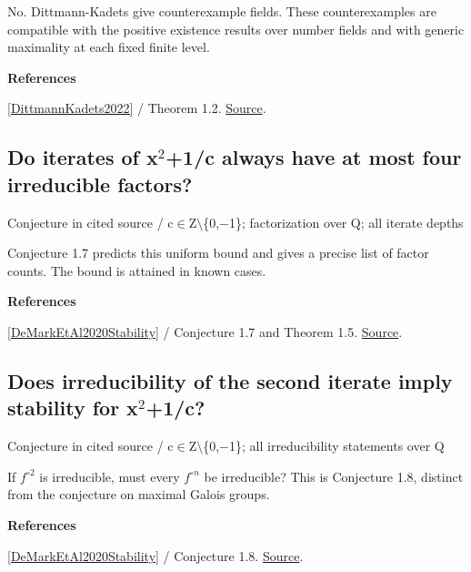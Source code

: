 \documentclass[11pt,a4paper,oneside,openany]{book}
\newenvironment{sources}{\par\smallskip\begingroup\footnotesize\color{atlasgray}\leftskip=10pt\setlength{\parskip}{2pt}}{\par\endgroup\smallskip}
\begin{document}
\color{black} No. Dittmann-Kadets give counterexample fields. These counterexamples are compatible with the positive existence results over number fields and with generic maximality at each fixed finite level.\par
\begin{sources}
\textbf{References}\par\smallskip
\noindent\hyperlink{ref:DittmannKadets2022}{[DittmannKadets2022]} / Theorem 1.2.  \href{https://arxiv.org/abs/2012.03076}{Source}.\par
\end{sources}\color{black}
\subsection*{Do iterates of x\ensuremath{{}^2}+1/c always have at most four irreducible factors?}
{\small\sffamily\color{atlasgold}Conjecture in cited source / c\ensuremath{\in}Z\ensuremath{\setminus}\{0,\ensuremath{-}1\}; factorization over Q; all iterate depths}\par\smallskip
\color{black} Conjecture 1.7 predicts this uniform bound and gives a precise list of factor counts. The bound is attained in known cases.\par
\begin{sources}
\textbf{References}\par\smallskip
\noindent\hyperlink{ref:DeMarkEtAl2020Stability}{[DeMarkEtAl2020Stability]} / Conjecture 1.7 and Theorem 1.5.  \href{https://nyjm.albany.edu/j/2020/26-25.html}{Source}.\par
\end{sources}\color{black}
\subsection*{Does irreducibility of the second iterate imply stability for x\ensuremath{{}^2}+1/c?}
{\small\sffamily\color{atlasgold}Conjecture in cited source / c\ensuremath{\in}Z\ensuremath{\setminus}\{0,\ensuremath{-}1\}; all irreducibility statements over Q}\par\smallskip
\color{black} If \(f^{\circ2}\) is irreducible, must every \(f^{\circ n}\) be irreducible? This is Conjecture 1.8, distinct from the conjecture on maximal Galois groups.\par
\begin{sources}
\textbf{References}\par\smallskip
\noindent\hyperlink{ref:DeMarkEtAl2020Stability}{[DeMarkEtAl2020Stability]} / Conjecture 1.8.  \href{https://nyjm.albany.edu/j/2020/26-25.html}{Source}.\par
\end{sources}\color{black}
\end{document}

